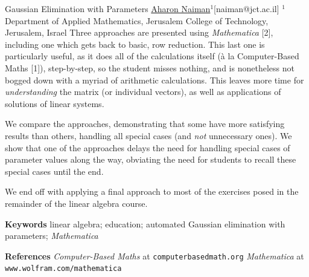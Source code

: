 \begin{abstract_online}{Gaussian Elimination with Parameters}{%
        \underline{Aharon Naiman}$^{1}$}{[naiman@jct.ac.il]
        }{%
        $^1$ Department of Applied Mathematics, Jerusalem College of
    Technology, Jerusalem, Israel}
Three approaches are presented using \emph{Mathematica} [2], including
one which gets back to basic, row reduction.  This last one is
particularly useful, as it does all of the calculations itself (\`{a}
la Computer-Based Maths [1]), step-by-step, so the student misses
nothing, and is nonetheless not bogged down with a myriad of
arithmetic calculations.  This leaves more time for
\emph{understanding} the matrix (or individual vectors), as well as
applications of solutions of linear systems.

We compare the approaches, demonstrating that some have more
satisfying results than others, handling all special cases (and
\emph{not} unnecessary ones).  We show that one of the approaches
delays the need for handling special cases of parameter values along
the way, obviating the need for students to recall these special cases
until the end.

We end off with applying a final approach to most of the exercises
posed in the remainder of the linear algebra course.

\textbf{Keywords} \newline{} linear algebra; education; automated
Gaussian elimination with parameters; \emph{Mathematica}

\textbf{References} \newline{}
\emph{Computer-Based Maths} at \texttt{computerbasedmath.org} \newline{}
\emph{Mathematica} at \texttt{www.wolfram.com/mathematica} \newline{}
\end{abstract_online}
    
